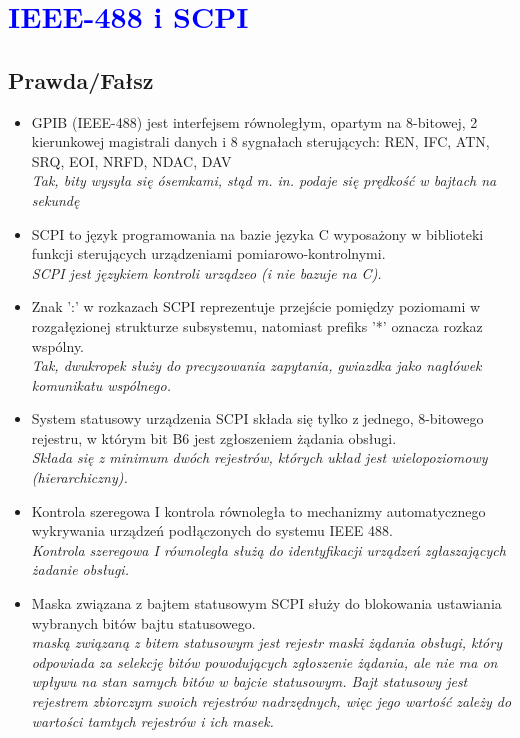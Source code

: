 \documentclass[a4paper,twoside]{article}
\begin{document}
\section{\textcolor{blue}{IEEE-488 i SCPI}}
\subsection*{Prawda/Fałsz}
\begin{itemize}
	
	\item \textcolor{tak}{GPIB (IEEE-488) jest interfejsem równoległym, opartym na 8-bitowej, 2 kierunkowej magistrali danych i 8 sygnałach sterujących: REN, IFC, ATN, SRQ, EOI, NRFD, NDAC, DAV} \\
	{\small \emph{Tak, bity wysyła się ósemkami, stąd m. in. podaje się prędkość w bajtach na sekundę}}
	
	\item \textcolor{nie}{SCPI to język programowania na bazie języka C wyposażony w biblioteki funkcji sterujących urządzeniami pomiarowo-kontrolnymi.} \\
	{\small \emph{SCPI jest językiem kontroli urządzeo (i nie bazuje na C).}}
	
	\item \textcolor{tak}{Znak ':' w rozkazach SCPI reprezentuje przejście pomiędzy poziomami w rozgałęzionej strukturze subsystemu, natomiast prefiks '*' oznacza rozkaz wspólny.} \\
	{\small \emph{Tak, dwukropek służy do precyzowania zapytania, gwiazdka jako nagłówek komunikatu wspólnego.}}
	
	\item \textcolor{nie}{System statusowy urządzenia SCPI składa się tylko z jednego, 8-bitowego rejestru, w którym bit B6 jest zgłoszeniem żądania obsługi.} \\
	{\small \emph{Składa się z minimum dwóch rejestrów, których układ jest wielopoziomowy (hierarchiczny).}}
	
	\item \textcolor{nie}{Kontrola szeregowa I kontrola równoległa to mechanizmy automatycznego wykrywania urządzeń podłączonych do systemu IEEE 488.} \\
	{\small \emph{Kontrola szeregowa I równoległa służą do identyfikacji urządzeń zgłaszających żadanie obsługi.}}
	
	\item \textcolor{nie}{Maska związana z bajtem statusowym SCPI służy do blokowania ustawiania wybranych bitów bajtu statusowego.} \\
	{\small \emph{maską związaną z bitem statusowym jest rejestr maski żądania obsługi, który odpowiada za selekcję bitów powodujących zgłoszenie żądania, ale nie ma on wpływu na stan samych bitów w bajcie statusowym. Bajt statusowy jest rejestrem zbiorczym swoich rejestrów nadrzędnych, więc jego wartość zależy do wartości tamtych rejestrów i ich masek.}}
	
\end{itemize}
\end{document}
